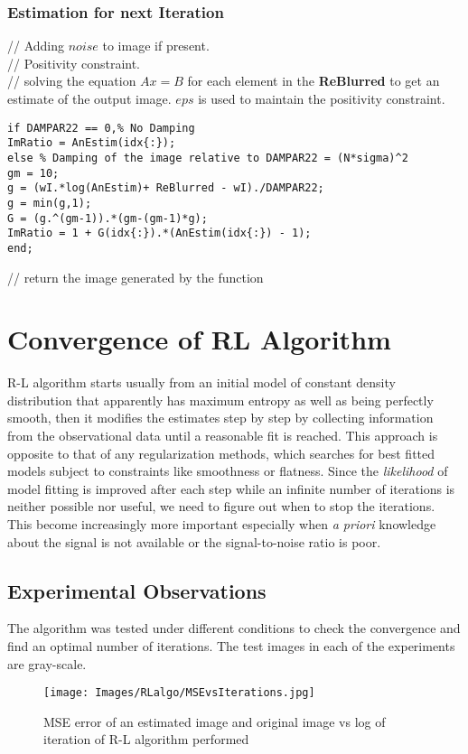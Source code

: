 \documentclass[a4paper]{book}
\begin{document}
\subsubsection{Estimation for next Iteration}
 // Adding $ noise $ to image if present. \\
 // Positivity constraint. \\
 // solving the equation $ Ax=B  $ for each element in the \textbf{\small ReBlurred} to get an estimate of the output image. $ eps $ is used to maintain the positivity constraint.
\begin{lstlisting}
if DAMPAR22 == 0,% No Damping
ImRatio = AnEstim(idx{:});
else % Damping of the image relative to DAMPAR22 = (N*sigma)^2
gm = 10;
g = (wI.*log(AnEstim)+ ReBlurred - wI)./DAMPAR22;
g = min(g,1);
G = (g.^(gm-1)).*(gm-(gm-1)*g);
ImRatio = 1 + G(idx{:}).*(AnEstim(idx{:}) - 1);
end;
\end{lstlisting}
\bigskip
{} // return the image generated by the function



\section{\Large Convergence of RL Algorithm}\label{secConvRL}
R-L algorithm starts usually from an initial model of constant density distribution that apparently has maximum entropy as well as being perfectly smooth, then it modifies the estimates step by step by collecting information from the observational data until a reasonable fit is reached. This approach is opposite to that of any regularization methods, which searches for best fitted models subject to constraints like smoothness or flatness.
Since the \textit{likelihood} of model fitting is improved after each step while an infinite number of iterations is neither possible nor useful, we need to figure out when to stop the iterations. This become increasingly more important especially when \textit{a priori} knowledge about the signal is not available or the signal-to-noise ratio is poor.\cite{Bi94conv}
\newpage	
\subsection[Experiments]{Experimental Observations}
The algorithm was tested under different conditions to check the convergence and find an optimal number of iterations. The test images in each of the experiments are gray-scale. 
\begin{figure}[H]
	\texttt{[image: Images/RLalgo/MSEvsIterations.jpg]}
	\caption{MSE error of an estimated image and original image vs log of iteration of R-L algorithm performed }
	\label{MSE1}
\end{figure}
\end{document}
